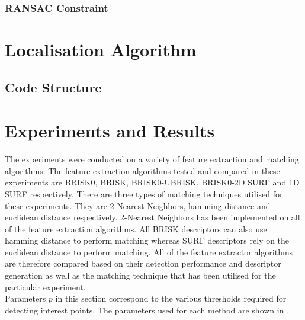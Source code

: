 \documentclass{article}
\begin{document}
\subsubsection{RANSAC Constraint}
\label{sec:ransacConstraint}




\section{Localisation Algorithm}
\label{sec:localisation}

\subsection{Code Structure}
\label{sec:codeStructure}

\section{Experiments and Results}
\label{sec:experimentsResults}
The experiments were conducted on a variety of feature extraction and matching algorithms. The feature extraction algorithms tested and compared in these experiments are BRISK0, BRISK, BRISK0-UBRISK, BRISK0-2D SURF and 1D SURF respectively. There are three types of matching techniques utilised for these experiments. They are 2-Nearest Neighbors, hamming distance and euclidean distance respectively. 2-Nearest Neighbors has been implemented on all of the feature extraction algorithms. All BRISK descriptors can also use hamming distance to perform matching whereas SURF descriptors rely on the euclidean distance to perform matching. All of the feature extractor algorithms are therefore compared based on their detection performance and descriptor generation as well as the matching technique that has been utilised for the particular experiment.\\

Parameters $p$ in this section correspond to the various thresholds required for detecting interest points. The parameters used for each method are shown in .\\
\end{document}
